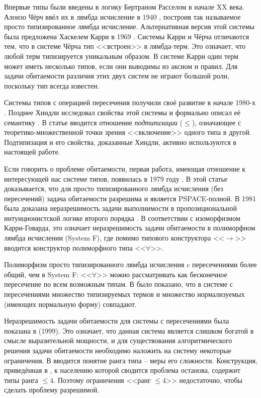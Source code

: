 \documentclass[../main.tex]{subfiles}
\begin{document}
 \label{sec:domain_review}

Впервые типы были введены в логику Бертраном Расселом в начале XX века. Алонзо Чёрч ввёл их в лямбда исчисление в 1940 \cite{church_1940}, построив так называемое просто типизированное лямбда исчисление. Альтернативная версия этой системы была предложена Хаскелем Карри в 1969 \cite{curry_1969}. Системы Карри и Чёрча отличаются тем, что в системе Чёрча тип <<встроен>> в лямбда-терм. Это означает, что любой терм типизируется уникальным образом. В системе Карри один терм может иметь несколько типов, если они выводимы из аксиом и правил. Для задачи обитаемости различия этих двух систем не играют большой роли, поскольку тип всегда известен.

Системы типов с операцией пересечения получили своё развитие в начале 1980-х \cite{coppo_1980, coppo_1981}. Позднее Хиндли исследовал свойства этой системы и формально описал её семантику \cite{hindley_1982}. В статье вводится отношение {\it подтипизации} ($\leqslant$), означающее с теоретико-множественной точки зрения <<включение>> одного типа в другой.  Подтипизация и его свойства, доказанные Хиндли, активно используются в настоящей работе. 

Если говорить о проблеме обитаемости, первая работа, имеющая отношение к интересующей нас системе типов, появилась в 1979 году \cite{statman_1979}. В этой статье доказывается, что для просто типизированного лямбда исчисления (без пересечений) задача обитаемости разрешима и является PSPACE-полной. В 1981 была доказана неразрешимость задачи выполнимости в пропозициональной интуиционистской логике второго порядка \cite{gabbay_1981}. В соответствии с изоморфизмом Карри-Говарда, это означает неразрешимость задачи обитаемости в полиморфном лямбда исчислении (System F), где помимо типового конструктора <<$\to$>> вводится конструктор полиморфного типа <<$\forall$>>.

Полиморфизм просто типизированного лямбда исчисления c пересечениями более общий, чем в System F: <<$\forall$>> можно рассматривать как бесконечное пересечение по всем возможным типам. В \cite{pottinger_1980} было показано, что в системе с пересечениями множество типизируемых термов и множество нормализуемых (имеющих нормальную форму) совпадают. 

Неразрешимость задачи обитаемости для системы с пересечениями была показана в \cite{urzyczyn_1999} (1999). %
Это означает, что данная система является слишком богатой в смысле выразительной мощности, и для существования алгоритмического решения задачи обитаемости необходимо наложить на систему некоторые ограничения. В \cite{leivant_1983} вводится понятие ранга типа -- меры его сложности. Конструкция, приведённая в \cite{urzyczyn_1999}, к населению которой сводится проблема останова, содержит типы ранга $\leqslant 4$. Поэтому ограничения <<ранг $\leqslant 4$>> недостаточно, чтобы сделать проблему разрешимой. 
\end{document}
